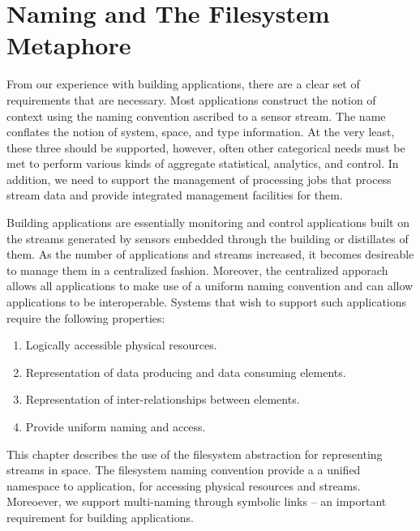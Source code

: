 

\section{Naming and The Filesystem Metaphore}
\label{chap:naming}

From our experience with building applications, there are a clear set of requirements that are necessary.  Most applications
construct the notion of context using the naming convention ascribed to a sensor stream.  The name conflates the notion of system,
space, and type information.  At the very least, these three should be supported, however, often other categorical needs must be
met to perform various kinds of aggregate statistical, analytics, and control.  In addition, we need to support the management of
processing jobs that process stream data and provide integrated management facilities for them.

Building applications are essentially monitoring and control applications built on the streams generated by sensors embedded through
the building or distillates of them.  As the number of applications and streams increased, it becomes desireable to manage them 
in a centralized fashion.  Moreover, the centralized apporach allows all applications to make use of a uniform naming convention and
can allow applications to be interoperable.  Systems that wish to support such applications require the following properties:

\begin{enumerate}
\item Logically accessible physical resources.
\item Representation of data producing and data consuming elements.
\item Representation of inter-relationships between elements.
\item Provide uniform naming and access.
\end{enumerate}

This chapter describes the use of the filesystem abstraction for representing streams in space.  The filesystem naming convention
provide a a unified namespace to application, for accessing physical resources and streams.  Moreoever, we support multi-naming through
symbolic links -- an important requirement for building applications.  



% 
% 
% 




